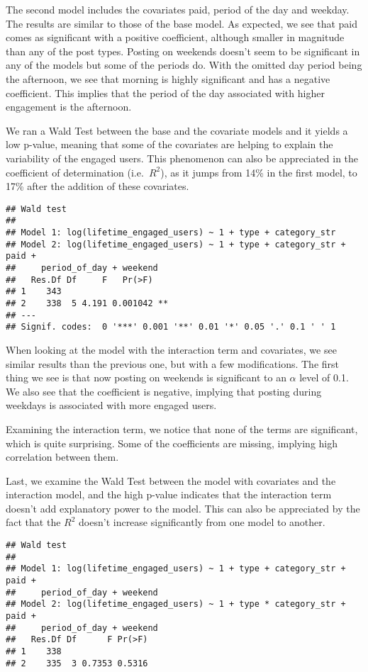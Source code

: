 \documentclass[
]{article}
\begin{document}
The second model includes the covariates paid, period of the day and
weekday. The results are similar to those of the base model. As
expected, we see that paid comes as significant with a positive
coefficient, although smaller in magnitude than any of the post types.
Posting on weekends doesn't seem to be significant in any of the models
but some of the periods do. With the omitted day period being the
afternoon, we see that morning is highly significant and has a negative
coefficient. This implies that the period of the day associated with
higher engagement is the afternoon.

We ran a Wald Test between the base and the covariate models and it
yields a low p-value, meaning that some of the covariates are helping to
explain the variability of the engaged users. This phenomenon can also
be appreciated in the coefficient of determination (i.e.~\(R^2\)), as it
jumps from 14\% in the first model, to 17\% after the addition of these
covariates.

\begin{verbatim}
## Wald test
## 
## Model 1: log(lifetime_engaged_users) ~ 1 + type + category_str
## Model 2: log(lifetime_engaged_users) ~ 1 + type + category_str + paid + 
##     period_of_day + weekend
##   Res.Df Df     F   Pr(>F)   
## 1    343                     
## 2    338  5 4.191 0.001042 **
## ---
## Signif. codes:  0 '***' 0.001 '**' 0.01 '*' 0.05 '.' 0.1 ' ' 1
\end{verbatim}

When looking at the model with the interaction term and covariates, we
see similar results than the previous one, but with a few modifications.
The first thing we see is that now posting on weekends is significant to
an \(\alpha\) level of 0.1. We also see that the coefficient is
negative, implying that posting during weekdays is associated with more
engaged users.

Examining the interaction term, we notice that none of the terms are
significant, which is quite surprising. Some of the coefficients are
missing, implying high correlation between them.

Last, we examine the Wald Test between the model with covariates and the
interaction model, and the high p-value indicates that the interaction
term doesn't add explanatory power to the model. This can also be
appreciated by the fact that the \(R^2\) doesn't increase significantly
from one model to another.

\begin{verbatim}
## Wald test
## 
## Model 1: log(lifetime_engaged_users) ~ 1 + type + category_str + paid + 
##     period_of_day + weekend
## Model 2: log(lifetime_engaged_users) ~ 1 + type * category_str + paid + 
##     period_of_day + weekend
##   Res.Df Df      F Pr(>F)
## 1    338                 
## 2    335  3 0.7353 0.5316
\end{verbatim}
\end{document}
